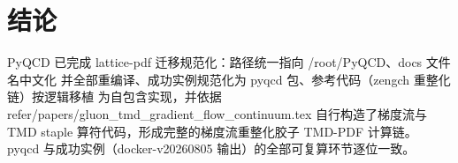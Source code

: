 \documentclass[12pt,a4paper]{ctexart}
\begin{document}
\section{结论}

PyQCD 已完成 lattice-pdf 迁移规范化：路径统一指向 /root/PyQCD、docs 文件名中文化
并全部重编译、成功实例规范化为 pyqcd 包、参考代码（zengch 重整化链）按逻辑移植
为自包含实现，并依据 refer/papers/gluon\_tmd\_gradient\_flow\_continuum.tex
自行构造了梯度流与 TMD staple 算符代码，形成完整的梯度流重整化胶子 TMD-PDF 计算链。
pyqcd 与成功实例（docker-v20260805 输出）的全部可复算环节逐位一致。
\end{document}
